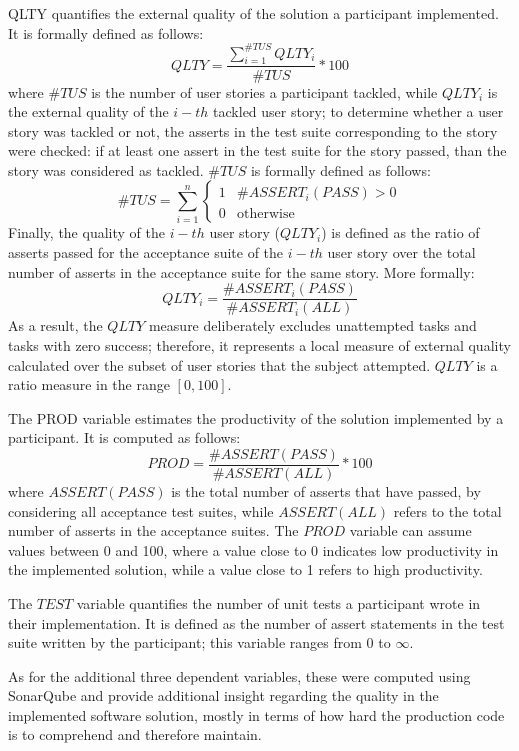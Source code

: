 QLTY quantifies the external quality of the solution a participant implemented. It is formally defined as follows: 
\[
    QLTY = \frac{\sum_{i=1}^{\#TUS} QLTY_i}{\#TUS} * 100 
\]
where $\#TUS$ is the number of user stories a participant tackled, while $QLTY_i$ is the external quality of the $i-th$ tackled user story; to determine whether a user story was tackled or not, the asserts in the test suite corresponding to the story were checked: if at least one assert in the test suite for the story passed, than the story was considered as tackled. $\#TUS$ is formally defined as follows:
\[
    \#TUS = \sum_{i=1}^{n} 
        \begin{cases}
            1 & \text{$\#ASSERT_i(PASS) > 0$}\\
                0 & \text{otherwise}
        \end{cases}
\]
Finally, the quality of the $i-th$ user story (\ie $QLTY_i$) is defined as the ratio of asserts passed for the acceptance suite of the $i-th$ user story over the total number of asserts in the acceptance suite for the same story. More formally:
\[
    QLTY_i = \frac{\#ASSERT_i(PASS)}{\#ASSERT_i(ALL)}
\]
As a result, the $QLTY$ measure deliberately excludes unattempted tasks and tasks with zero success; therefore, it represents a local measure of external quality calculated over the subset of user stories that the subject attempted. $QLTY$ is a ratio measure in the range $[0, 100]$.

The PROD variable estimates the productivity of the solution implemented by a participant. It is computed as follows:
\[
    PROD = \frac{\#ASSERT(PASS)}{\#ASSERT(ALL)} * 100
\]
where $ASSERT(PASS)$ is the total number of asserts that have passed, by considering all acceptance test suites, while $ASSERT(ALL)$ refers to the total number of asserts in the acceptance suites. The $PROD$ variable can assume values between 0 and 100, where a value close to 0 indicates low productivity in the implemented solution, while a value close to 1 refers to high productivity.

The $TEST$ variable quantifies the number of unit tests a participant wrote in their implementation. It is defined as the number of assert statements in the test suite written by the participant; this variable ranges from 0 to $\infty$.

As for the additional three dependent variables, these were computed using SonarQube and provide additional insight regarding the quality in the implemented software solution, mostly in terms of how hard the production code is to comprehend and therefore maintain. 

